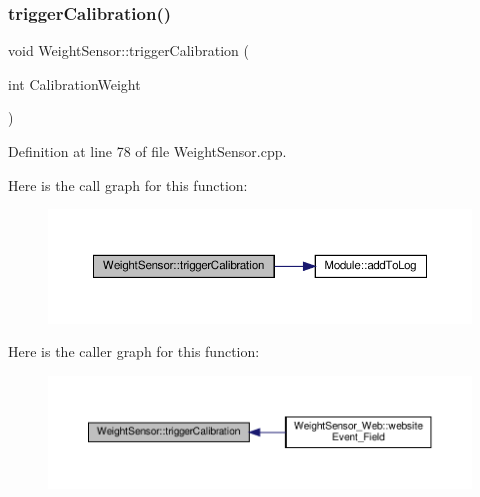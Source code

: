 \mbox{\label{class_weight_sensor_a37b50db6dc60c3bc6a22807af5e17283}} 
\subsubsection{\texorpdfstring{trigger\+Calibration()}{triggerCalibration()}\hspace{0.1cm}{\footnotesize\ttfamily [1/2]}}
{\footnotesize\ttfamily void Weight\+Sensor\+::trigger\+Calibration (\begin{DoxyParamCaption}\item[{int}]{Calibration\+Weight }\end{DoxyParamCaption})}



Definition at line 78 of file Weight\+Sensor.\+cpp.

Here is the call graph for this function\+:
\nopagebreak
\begin{figure}[H]
\begin{center}
\leavevmode
\includegraphics[width=350pt]{class_weight_sensor_a37b50db6dc60c3bc6a22807af5e17283_cgraph}
\end{center}
\end{figure}
Here is the caller graph for this function\+:
\nopagebreak
\begin{figure}[H]
\begin{center}
\leavevmode
\includegraphics[width=350pt]{class_weight_sensor_a37b50db6dc60c3bc6a22807af5e17283_icgraph}
\end{center}
\end{figure}
\mbox{\label{class_weight_sensor_a37b50db6dc60c3bc6a22807af5e17283}} 
